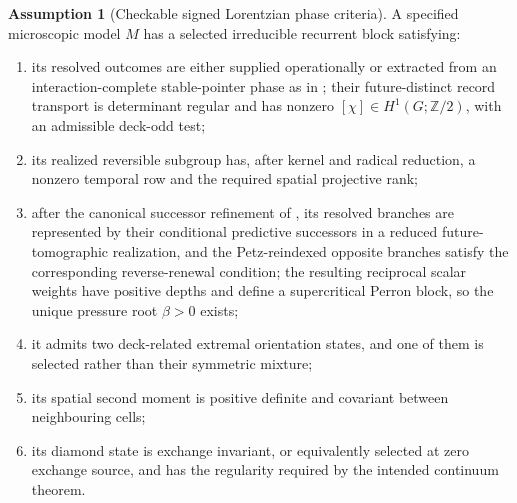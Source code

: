 \documentclass[11pt]{article}
\theoremstyle{definition}
\newtheorem{assumption}{Assumption}[section]
\theoremstyle{remark}
\newcommand{\Ztwo}{\mathbb Z/2}
\begin{document}
\begin{assumption}[Checkable signed Lorentzian phase criteria]
\label{ass:lorentzian-phase}
A specified microscopic model $M$ has a selected irreducible recurrent block
satisfying:
\begin{enumerate}[label=\textup{(C\arabic*)},leftmargin=3em]
\item its resolved outcomes are either supplied operationally or extracted from
      an interaction-complete stable-pointer phase as in
      ; their future-distinct record
      transport is determinant regular and has nonzero
      $[\chi]\in H^1(G;\Ztwo)$, with an admissible deck-odd test;
\item its realized reversible subgroup has, after kernel and radical reduction,
      a nonzero temporal row and the required spatial projective rank;
\item after the canonical successor refinement of
      , its resolved branches are represented by
      their conditional predictive successors in a reduced future-tomographic
      realization, and the Petz-reindexed opposite branches satisfy the
      corresponding reverse-renewal condition; the resulting reciprocal scalar
      weights have positive depths and define a supercritical Perron block, so
      the unique pressure root $\beta>0$ exists;
\item it admits two deck-related extremal orientation states, and one of them is
      selected rather than their symmetric mixture;
\item its spatial second moment is positive definite and covariant between
      neighbouring cells;
\item its diamond state is exchange invariant, or equivalently selected at zero
      exchange source, and has the regularity required by the intended
      continuum theorem.
\end{enumerate}
\end{assumption}
\end{document}
